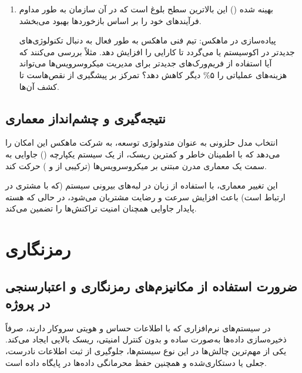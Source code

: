 \documentclass[12pt,a4paper]{report}
\begin{document}
\begin{enumerate}
پیاده‌سازی در ماهکس: برای سیستم جدید، ما شروع به جمع‌آوری متریک‌ها می‌کنیم:

متوسط زمان پاسخگویی () سرویس جدید  در مقایسه با ماژول قدیمی جاوا چند میلی‌ثانیه بهبود یافته است؟

نرخ خطا () در ارتباط بین دو زبان چقدر است؟

میزان مصرف منابع سرور () پس از مهاجرت به  چقدر کاهش یافته است؟ مدیران ماهکس بر اساس این اعداد تصمیم می‌گیرند که آیا به مهاجرت ادامه دهند یا استراتژی را تغییر دهند.
\item 
بهینه شده () 
این بالاترین سطح بلوغ است که در آن سازمان به طور مداوم فرآیندهای خود را بر اساس بازخوردها بهبود می‌بخشد.

پیاده‌سازی در ماهکس: تیم فنی ماهکس به طور فعال به دنبال تکنولوژی‌های جدیدتر در اکوسیستم  یا  می‌گردد تا کارایی را افزایش دهد. مثلاً بررسی می‌کنند که آیا استفاده از فریم‌ورک‌های جدیدتر برای مدیریت میکروسرویس‌ها می‌تواند هزینه‌های عملیاتی را ۵\% دیگر کاهش دهد؟ تمرکز بر پیشگیری از نقص‌هاست تا کشف آن‌ها.
\end{enumerate}
\section{نتیجه‌گیری و چشم‌انداز معماری}
انتخاب مدل حلزونی به عنوان متدولوژی توسعه، به شرکت ماهکس این امکان را می‌دهد که با اطمینان خاطر و کمترین ریسک، از یک سیستم یکپارچه () جاوایی به سمت یک معماری مدرن مبتنی بر میکروسرویس‌ها (ترکیبی از  و ) حرکت کند.

این تغییر معماری، با استفاده از زبان  در لبه‌های بیرونی سیستم (که با مشتری در ارتباط است) باعث افزایش سرعت و رضایت مشتریان می‌شود، در حالی که هسته پایدار جاوایی همچنان امنیت تراکنش‌ها را تضمین می‌کند.

\chapter{رمزنگاری}
\section{ضرورت استفاده از مکانیزم‌های رمزنگاری و اعتبارسنجی در پروژه}
در سیستم‌های نرم‌افزاری که با اطلاعات حساس و هویتی سروکار دارند، صرفاً ذخیره‌سازی داده‌ها به‌صورت ساده و بدون کنترل امنیتی، ریسک بالایی ایجاد می‌کند. یکی از مهم‌ترین چالش‌ها در این نوع سیستم‌ها، جلوگیری از ثبت اطلاعات نادرست، جعلی یا دستکاری‌شده و همچنین حفظ محرمانگی داده‌ها در پایگاه داده است.
\end{document}
